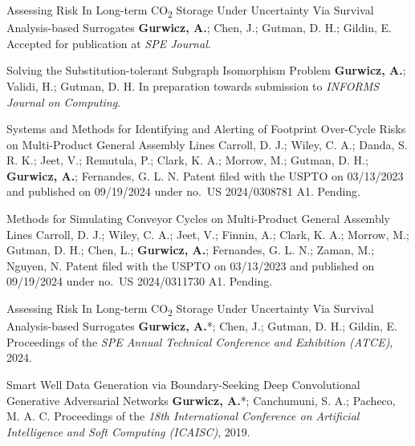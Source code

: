 
\cvpublication
    {Assessing Risk In Long-term CO\textsubscript{2} Storage Under Uncertainty Via Survival Analysis-based Surrogates}
    {\textbf{Gurwicz, A.}; Chen, J.; Gutman, D. H.; Gildin, E.}
    {Accepted for publication at \textit{SPE Journal}.}

\cvpublication
    {Solving the Substitution-tolerant Subgraph Isomorphism Problem}
    {\textbf{Gurwicz, A.}; Validi, H.; Gutman, D. H.}
    {In preparation towards submission to \textit{INFORMS Journal on Computing}.}


\cvpublication
    {Systems and Methods for Identifying and Alerting of Footprint Over-Cycle Risks on Multi-Product General Assembly
    Lines}
    {Carroll, D. J.; Wiley, C. A.; Danda, S. R. K.; Jeet, V.; Remutula, P.; Clark, K. A.; Morrow, M.; Gutman, D. H.;
    \textbf{Gurwicz, A.}; Fernandes, G. L. N.}
    {Patent filed with the USPTO on 03/13/2023 and published on 09/19/2024 under no.\ US 2024/0308781 A1. Pending.}

\cvpublication
    {Methods for Simulating Conveyor Cycles on Multi-Product General Assembly Lines}
    {Carroll, D. J.; Wiley, C. A.; Jeet, V.; Finnin, A.; Clark, K. A.; Morrow, M.; Gutman, D. H.; Chen, L.;
    \textbf{Gurwicz, A.}; Fernandes, G. L. N.; Zaman, M.; Nguyen, N.}
    {Patent filed with the USPTO on 03/13/2023 and published on 09/19/2024 under no.\ US 2024/0311730 A1. Pending.}


\cvpublication
    {Assessing Risk In Long-term CO\textsubscript{2} Storage Under Uncertainty Via Survival Analysis-based Surrogates}
    {\textbf{Gurwicz, A.}*; Chen, J.; Gutman, D. H.; Gildin, E.}
    {Proceedings of the \textit{SPE Annual Technical Conference and Exhibition (ATCE)}, 2024.
    }

\cvpublication
    {Smart Well Data Generation via Boundary-Seeking Deep Convolutional Generative Adversarial Networks}
    {\textbf{Gurwicz, A.}*; Canchumuni, S. A.; Pacheco, M. A. C.}
    {Proceedings of the \textit{18th International Conference on Artificial Intelligence and Soft Computing (ICAISC)},
    2019. }

